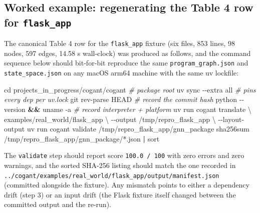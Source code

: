 \documentclass[
]{article}
\newenvironment{Shaded}{}{}
\newcommand{\AttributeTok}[1]{\textcolor[rgb]{0.49,0.56,0.16}{#1}}
\newcommand{\BuiltInTok}[1]{\textcolor[rgb]{0.00,0.50,0.00}{#1}}
\newcommand{\CommentTok}[1]{\textcolor[rgb]{0.38,0.63,0.69}{\textit{#1}}}
\newcommand{\DataTypeTok}[1]{\textcolor[rgb]{0.56,0.13,0.00}{#1}}
\newcommand{\ExtensionTok}[1]{#1}
\newcommand{\FunctionTok}[1]{\textcolor[rgb]{0.02,0.16,0.49}{#1}}
\newcommand{\KeywordTok}[1]{\textcolor[rgb]{0.00,0.44,0.13}{\textbf{#1}}}
\newcommand{\NormalTok}[1]{#1}
\newcommand{\PreprocessorTok}[1]{\textcolor[rgb]{0.74,0.48,0.00}{#1}}
\begin{document}
\subsection{\texorpdfstring{Worked example: regenerating the Table 4 row
for
\texttt{flask\_app}}{Worked example: regenerating the Table 4 row for flask\_app}}\label{worked-example-regenerating-the-table-4-row-for-flask_app}

The canonical Table 4 row for the \texttt{flask\_app} fixture (six
files, 853 lines, 98 nodes, 597 edges, 14.58 s wall-clock) was produced
as follows, and the command sequence below should bit-for-bit reproduce
the same \texttt{program\_graph.json} and \texttt{state\_space.json} on
any macOS arm64 machine with the same uv lockfile:

\begin{Shaded}
\begin{Highlighting}[]
\BuiltInTok{cd}\NormalTok{ projects\_in\_progress/cogant/cogant           }\CommentTok{\# package root}
\ExtensionTok{uv}\NormalTok{ sync }\AttributeTok{{-}{-}extra}\NormalTok{ all                               }\CommentTok{\# pins every dep per uv.lock}
\FunctionTok{git}\NormalTok{ rev{-}parse HEAD                                }\CommentTok{\# record the commit hash}
\ExtensionTok{python} \AttributeTok{{-}{-}version} \KeywordTok{\&\&} \FunctionTok{uname} \AttributeTok{{-}a}                      \CommentTok{\# record interpreter + platform}
\ExtensionTok{uv}\NormalTok{ run cogant translate }\DataTypeTok{\textbackslash{}}
\NormalTok{    examples/real\_world/flask\_app }\DataTypeTok{\textbackslash{}}
    \AttributeTok{{-}{-}output}\NormalTok{ /tmp/repro\_flask\_app }\DataTypeTok{\textbackslash{}}
    \AttributeTok{{-}{-}layout{-}output}
\ExtensionTok{uv}\NormalTok{ run cogant validate /tmp/repro\_flask\_app/gnn\_package}
\FunctionTok{sha256sum}\NormalTok{ /tmp/repro\_flask\_app/gnn\_package/}\PreprocessorTok{*}\NormalTok{.json }\KeywordTok{|} \FunctionTok{sort}
\end{Highlighting}
\end{Shaded}

The \texttt{validate} step should report score \texttt{100.0\ /\ 100}
with zero errors and zero warnings, and the sorted SHA-256 listing
should match the one recorded in
\texttt{../cogant/examples/real\_world/flask\_app/output/manifest.json}
(committed alongside the fixture). Any mismatch points to either a
dependency drift (step 3) or an input drift (the Flask fixture itself
changed between the committed output and the re-run).
\end{document}
